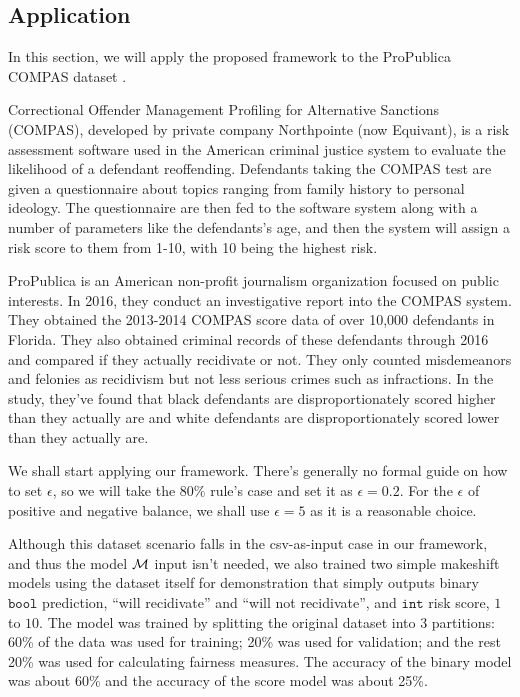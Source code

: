 \documentclass[conference]{IEEEtran}
\begin{document}
\subsection{Application}
\label{sec:app}
In this section, we will apply the proposed framework to the ProPublica COMPAS dataset \cite{angwin2016machine,larson2016compas,larson2016propublica}.

Correctional Offender Management Profiling for Alternative Sanctions (COMPAS), developed by private company Northpointe (now Equivant), is a risk assessment software used in the American criminal justice system to evaluate the likelihood of a defendant reoffending. Defendants taking the COMPAS test are given a questionnaire about topics ranging from family history to personal ideology. The questionnaire are then fed to the software system along with a number of parameters like the defendants's age, and then the system will assign a risk score to them from 1-10, with 10 being the highest risk.

ProPublica is an American non-profit journalism organization focused on public interests. In 2016, they conduct an investigative report into the COMPAS system. They obtained the 2013-2014 COMPAS score data of over 10,000 defendants in Florida. They also obtained criminal records of these defendants through 2016 and compared if they actually recidivate or not. They only counted misdemeanors and felonies as recidivism but not less serious crimes such as infractions. In the study, they've found that black defendants are disproportionately scored higher than they actually are and white defendants are disproportionately scored lower than they actually are.

We shall start applying our framework. There's generally no formal guide on how to set $\epsilon$, so we will take the 80\% rule's case and set it as $\epsilon = 0.2$. For the $\epsilon$ of positive and negative balance, we shall use $\epsilon = 5$ as it is a reasonable choice.

Although this dataset scenario falls in the csv-as-input case in our framework, and thus the model $\mathcal{M}$ input isn't needed, we also trained two simple makeshift models using the dataset itself for demonstration that simply outputs binary $\mathtt{bool}$ prediction, ``will recidivate'' and ``will not recidivate'', and $\mathtt{int}$ risk score, $1$ to $10$. The model was trained by splitting the original dataset into 3 partitions: 60\% of the data was used for training; 20\% was used for validation; and the rest 20\% was used for calculating fairness measures. The accuracy of the binary model was about 60\% and the accuracy of the score model was about 25\%.
\end{document}
